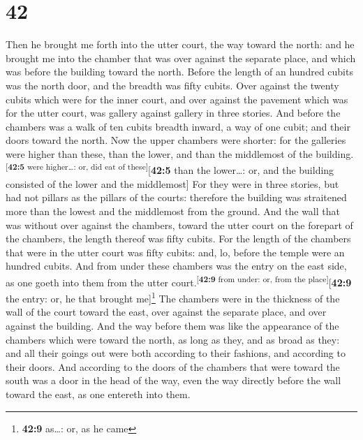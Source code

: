 \hypertarget{section-41}{%
\section{42}\label{section-41}}

 Then he brought me forth into the utter court, the way
toward the north: and he brought me into the chamber that was over
against the separate place, and which was before the building toward the
north.  Before the length of an hundred cubits was the
north door, and the breadth was fifty cubits.  Over
against the twenty cubits which were for the inner court, and over
against the pavement which was for the utter court, was gallery against
gallery in three stories.  And before the chambers was a
walk of ten cubits breadth inward, a way of one cubit; and their doors
toward the north.  Now the upper chambers were shorter:
for the galleries were higher than these, than the lower, and than the
middlemost of the building.\textsuperscript{{[}\textbf{42:5} were
higher\ldots: or, did eat of these{]}}{[}\textbf{42:5} than the
lower\ldots: or, and the building consisted of the lower and the
middlemost{]}  For they were in three stories, but had not
pillars as the pillars of the courts: therefore the building was
straitened more than the lowest and the middlemost from the ground.
 And the wall that was without over against the chambers,
toward the utter court on the forepart of the chambers, the length
thereof was fifty cubits.  For the length of the chambers
that were in the utter court was fifty cubits: and, lo, before the
temple were an hundred cubits.  And from under these
chambers was the entry on the east side, as one goeth into them from the
utter court.\textsuperscript{{[}\textbf{42:9} from under: or, from the
place{]}}{[}\textbf{42:9} the entry: or, he that brought
me{]}\footnote{\textbf{42:9} as\ldots: or, as he came} 
The chambers were in the thickness of the wall of the court toward the
east, over against the separate place, and over against the building.
 And the way before them was like the appearance of the
chambers which were toward the north, as long as they, and as broad as
they: and all their goings out were both according to their fashions,
and according to their doors.  And according to the doors
of the chambers that were toward the south was a door in the head of the
way, even the way directly before the wall toward the east, as one
entereth into them.

